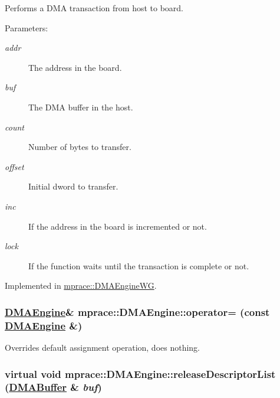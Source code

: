 Performs a DMA transaction from host to board. 

\begin{Desc}
\item[Parameters:]
\begin{description}
\item[{\em addr}]The address in the board. \item[{\em buf}]The DMA buffer in the host. \item[{\em count}]Number of bytes to transfer. \item[{\em offset}]Initial dword to transfer. \item[{\em inc}]If the address in the board is incremented or not. \item[{\em lock}]If the function waits until the transaction is complete or not.\end{description}
\end{Desc}


Implemented in \hyperlink{classmprace_1_1DMAEngineWG_a4}{mprace::DMAEngine\-WG}.\hypertarget{classmprace_1_1DMAEngine_b2}{
\subsubsection[operator=]{\setlength{\rightskip}{0pt plus 5cm}\hyperlink{classmprace_1_1DMAEngine}{DMAEngine}\& mprace::DMAEngine::operator= (const \hyperlink{classmprace_1_1DMAEngine}{DMAEngine} \&)}}
\label{classmprace_1_1DMAEngine_b2}


Overrides default assignment operation, does nothing. 

\hypertarget{classmprace_1_1DMAEngine_a6}{
\subsubsection[releaseDescriptorList]{\setlength{\rightskip}{0pt plus 5cm}virtual void mprace::DMAEngine::release\-Descriptor\-List (\hyperlink{classmprace_1_1DMABuffer}{DMABuffer} \& {\em buf})}}
\label{classmprace_1_1DMAEngine_a6}



